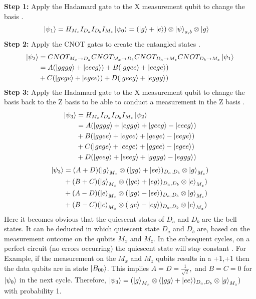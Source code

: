 \documentclass[9pt,a4paper,twocolumn,twoside]{tau-class/tau}
\begin{document}
\textbf{Step 1: } Apply the Hadamard gate to the X measurement qubit to change the basis \cite{fowler2012surface}. 
\begin{align}
\ket{\psi_1} &= H_{M_x} I_{D_a} I_{D_b} I_{M_z}\ket{\psi_0} = (\ket{g} + \ket{e}) \otimes \ket{\psi}_{a,b} \otimes \ket{g}
\label{eq: step 1}
\end{align}
\textbf{Step 2: }
Apply the CNOT gates to create the entangled states \cite{fowler2012surface}. 
\begin{align} 
\ket{\psi_2} &= CNOT_{M_x \rightarrow D_a} CNOT_{M_x \rightarrow D_b} CNOT_{D_a \rightarrow M_z} CNOT_{D_b \rightarrow M_z}\ket{\psi_1} \notag\\ &=
A(\ket{gggg}+ \ket{eeeg}) +B(\ket{ggee}+\ket{eege}) \notag\\ &+C(\ket{gege}+\ket{egee} ) +D(\ket{geeg}+ \ket{eggg})
\label{eq: step 2}
\end{align}
\textbf{Step 3: } 
Apply the Hadamard gate to the X measurement qubit to change the basis back to the Z basis to be able to conduct a measurement in the Z basis \cite{fowler2012surface}. 
\begin{align}
    \ket{\psi_3} 
    &= H_{M_x} I_{D_a} I_{D_b} I_{M_z}\ket{\psi_2} \notag \\
    &=A(\ket{gggg} + \ket{eggg} + \ket{geeg} - \ket{eeeg}) \notag \\ 
    &+B(\ket{ggee} + \ket{egee} + \ket{gege} - \ket{eege}) \notag\\
    &+C(\ket{gege} + \ket{eege} + \ket{ggee} - \ket{egee}) \notag\\
    &+D(\ket{geeg} + \ket{eeeg} + \ket{gggg} - \ket{eggg})
    \label{eq: step 3a}
\end{align}
\begin{align}
    \ket{\psi_3}   
    &=(A+D)(\ket{g}_{M_x} \otimes (\ket{gg}+\ket{ee})_{D_a,D_b} \otimes \ket{g}_{M_z}) \notag\\
    &+(B+C)(\ket{g}_{M_x} \otimes (\ket{ge}+\ket{eg})_{D_a,D_b} \otimes \ket{e}_{M_z}) \notag\\
    &+(A-D)(\ket{e}_{M_x} \otimes (\ket{gg}-\ket{ee})_{D_a,D_b} \otimes \ket{g}_{M_z}) \notag\\
    &+(B-C)(\ket{e}_{M_x} \otimes (\ket{ge}-\ket{eg})_{D_a,D_b} \otimes \ket{e}_{M_z})
    \label{eq: step 3b}
\end{align}
Here it becomes obvious that the quiescent states of $D_a$ and $D_b$ are the bell states. It can be deducted in which quiescent state $D_a$ and $D_b$ are, based on the measurement outcome on the qubits $M_x$ and $M_z$. In the subsequent cycles, on a perfect circuit (no errors occurring) the quiescent state will stay constant \cite{fowler2012surface}. For Example, if the measurement on the $M_x$ and $M_z$ qubits results in a {+1,+1} then the data qubits are in state $\ket{B_{00}}$. This implies $A=D=\frac{1}{\sqrt{2}},$ and $ B = C = 0$ for $\ket{\psi_0}$ in the next cycle. Therefore, $\ket{\psi_3} = (\ket{g}_{M_x} \otimes (\ket{gg}+\ket{ee})_{D_a,D_b} \otimes \ket{g}_{M_z})$ with probability 1. 
\end{document}
